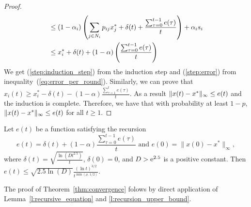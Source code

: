 \begin{proof}
\begin{align}
    &\leq
    (1-\alpha_i)\left(\sum_{j \in N_i} p_{ij} x^*_{j} +
    \delta(t) + \frac{\sum_{\tau=0}^{t-1} e(\tau)}{t} \right) +
    \alpha_i s_i \label{step:error} \\
    &\leq
    x_i^* + \delta(t) + (1-\alpha)
    \left(
    \frac{\sum_{\tau=0}^{t-1} e(\tau)}{t}
    \right)
    \nonumber
  \end{align}
  We get (\ref{step:induction_step}) from the induction step and
  (\ref{step:error}) from inequality~(\ref{eq:error_per_round}).
  Similarly, we can prove that
  $x_i(t) \geq x_i^* - \delta(t) - (1-\alpha)
  \frac{\sum_{\tau=1}^t e(\tau)}{t}$.
  As a result $\| x(t)-x^* \|_{\infty} \leq e(t)$ and the induction
  is complete.  Therefore, we have that with probability at least $1-p$,
  \(\| x(t) - x^* \|_{\infty} \leq e(t)\) for all $t\geq 1$.
\end{proof}

\begin{lemma}\label{l:recursion_upper_bound}
  Let $e(t)$ be a function satisfying the recursion
  \[
    e(t) =
    \delta(t) + (1-\alpha)\frac{\sum_{\tau=0}^{t-1}e(\tau)}{t}
    \text{ and } e(0)=\|x(0) - x^*\|_{\infty},
  \]
  where \(\delta(t) = \sqrt{\frac{\ln(D t^{2.5})}{t}} \), \(\delta(0) = 0 \),
  and $D > \mathrm{e}^{2.5}$ is a positive constant.  Then
  \(
    e(t) \leq
    \sqrt{2.5 \ln(D)} \frac{(\ln t)^{3/2}}{t^{\min(\rho,\, 1/2)}}.
  \)
\end{lemma}
\noindent The proof of Theorem~\ref{thm:convergence} folows by direct 
application of Lemma~\ref{l:recursive_equation} and \ref{l:recursion_upper_bound}. 